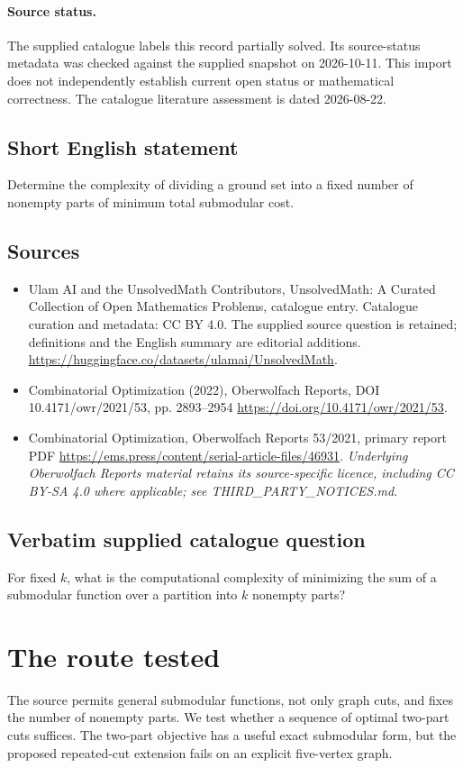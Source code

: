 \documentclass[11pt]{article}
\begin{document}
\paragraph{Source status.}
The supplied catalogue labels this record partially solved. Its source-status metadata was checked against the supplied snapshot on 2026-10-11. This import does not independently establish current open status or mathematical correctness. The catalogue literature assessment is dated 2026-08-22.
\subsection{Short English statement}
Determine the complexity of dividing a ground set into a fixed number of nonempty parts of minimum total submodular cost.
\subsection{Sources}
\begin{itemize}
\item[S1] Ulam AI and the UnsolvedMath Contributors, UnsolvedMath: A Curated Collection of Open Mathematics Problems, catalogue entry. Catalogue curation and metadata: CC BY 4.0. The supplied source question is retained; definitions and the English summary are editorial additions.
\url{https://huggingface.co/datasets/ulamai/UnsolvedMath}.
\item[S2] Combinatorial Optimization (2022), Oberwolfach Reports, DOI 10.4171/owr/2021/53, pp. 2893--2954
\url{https://doi.org/10.4171/owr/2021/53}.
\item[S3] Combinatorial Optimization, Oberwolfach Reports 53/2021, primary report PDF
\url{https://ems.press/content/serial-article-files/46931}.
\textit{Underlying Oberwolfach Reports material retains its source-specific licence, including CC BY-SA 4.0 where applicable; see THIRD\_PARTY\_NOTICES.md.}
\end{itemize}
\subsection{Verbatim supplied catalogue question}
For fixed $k$, what is the computational complexity of minimizing the sum of a submodular function over a partition into $k$ nonempty parts?

\section{The route tested}
The source permits general submodular functions, not only graph cuts,
and fixes the number of nonempty parts. We test whether a sequence
of optimal two-part cuts suffices. The two-part objective has a
useful exact submodular form, but the proposed repeated-cut extension
fails on an explicit five-vertex graph.
\end{document}
